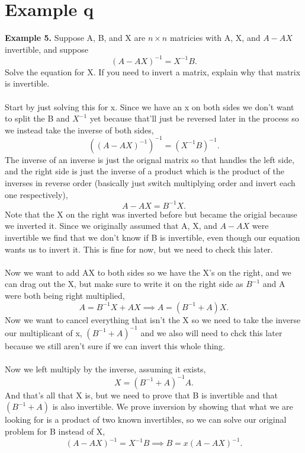 \documentclass{report}
\begin{document}
\section{Example q}%
\label{sec: Example q }
\textbf{Example 5.} Suppose A, B, and X are $ n\times n $ matricies with A, X, and $ A-AX $ invertible, and suppose 
\[
	\left( A-AX \right) ^{ -1 } = X^{ -1 }B
.\] 
Solve the equation for X. If you need to invert a matrix, explain why that matrix is invertible. \\\\
Start by just solving this for x. Since we have an x on both sides we don't want to split the B and $ X^{ -1 } $ yet because that'll just be reversed later in the process so we instead take the inverse of both sides,
\[
	\left( \left( A-AX \right) ^{ -1 } \right) ^{ -1 } = \left( X^{ -1 }B \right) ^{ -1 }
.\] 
The inverse of an inverse is just the orignal matrix so that handles the left side, and the right side is just the inverse of a product which is the product of the inverses in reverse order (basically just switch multiplying order and invert each one respectively),
\[
	A-AX = B^{ -1 }X
.\] 
Note that the X on the right was inverted before but became the origial because we inverted it. Since we originally assumed that A, X, and $ A-AX $ were invertible we find that we don't know if B is invertible, even though our equation wants us to invert it. This is fine for now, but we need to check this later. \\\\
Now we want to add AX to both sides so we have the X's on the right, and we can drag out the X, but make sure to write it on the right side as $ B^{ -1 } $ and A were both being right multiplied,
\[
A=B^{ -1 }X +AX \implies A= \left( B^{ -1 }+ A \right) X
.\] 
Now we want to cancel everything that isn't the X so we need to take the inverse our multiplicant of x, $ \left( B^{ -1 }+A \right) ^{ -1 } $ and we also will need to chck this later because we still aren't sure if we can invert this whole thing. \\\\
Now we left multiply by the inverse, assuming it exists,
\[
X=\left( B^{ -1 }+A \right) ^{ -1 }A
.\] 
And that's all that X is, but we need to prove that B is invertible and that $ \left( B^{ -1 }+A \right)  $ is also invertible. We prove inversion by showing that what we are looking for is a product of two known invertibles, so we can solve our original problem for B instead of X,
\[
	\left( A-AX \right) ^{ -1 }=X^{ -1 }B \implies B=x\left( A-AX \right) ^{ -1 }
.\] 
\end{document}
